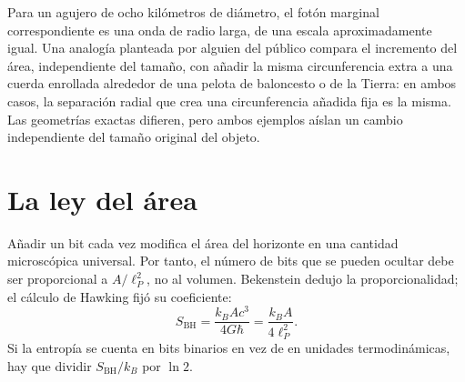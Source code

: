 \begin{classroomqa}
\end{classroomqa}

\begin{classroomqa}
\end{classroomqa}

Para un agujero de ocho kilómetros de diámetro, el fotón marginal correspondiente es una onda de radio larga, de una escala aproximadamente igual. Una analogía planteada por alguien del público compara el incremento del área, independiente del tamaño, con añadir la misma circunferencia extra a una cuerda enrollada alrededor de una pelota de baloncesto o de la Tierra: en ambos casos, la separación radial que crea una circunferencia añadida fija es la misma. Las geometrías exactas difieren, pero ambos ejemplos aíslan un cambio independiente del tamaño original del objeto.

\section{La ley del área}

Añadir un bit cada vez modifica el área del horizonte en una cantidad microscópica universal. Por tanto, el número de bits que se pueden ocultar debe ser proporcional a \(A/\ell_P^2\), no al volumen. Bekenstein dedujo la proporcionalidad; el cálculo de Hawking fijó su coeficiente:
\begin{equation}
S_{\mathrm{BH}}=\frac{k_B A c^3}{4G\hbar}
=\frac{k_B A}{4\ell_P^2}.
\label{eq:bh-entropy}
\end{equation}
Si la entropía se cuenta en bits binarios en vez de en unidades termodinámicas, hay que dividir \(S_{\mathrm{BH}}/k_B\) por \(\ln2\).

